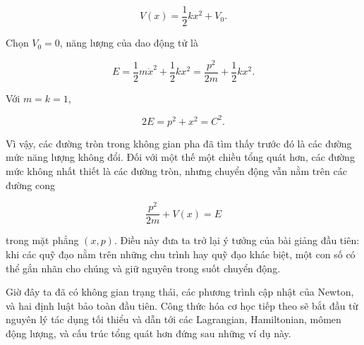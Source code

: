 \begin{equation}
  V(x)=\frac12kx^2+V_0.
  \label{eq:spring-potential}
\end{equation}

Chọn \(V_0=0\), năng lượng của dao động tử là

\begin{equation}
  E=\frac12m\dot x^2+\frac12kx^2
   =\frac{p^2}{2m}+\frac12kx^2.
  \label{eq:oscillator-energy}
\end{equation}

Với \(m=k=1\),

\begin{equation}
  2E=p^2+x^2=C^2.
  \label{eq:oscillator-energy-circle}
\end{equation}

Vì vậy, các đường tròn trong không gian pha đã tìm thấy trước đó là các đường mức năng lượng không đổi. Đối với một thế một chiều tổng quát hơn, các đường mức không nhất thiết là các đường tròn, nhưng chuyển động vẫn nằm trên các đường cong

\begin{equation}
  \frac{p^2}{2m}+V(x)=E
  \label{eq:general-energy-contour}
\end{equation}

trong mặt phẳng \((x,p)\). Điều này đưa ta trở lại ý tưởng của bài giảng đầu tiên: khi các quỹ đạo nằm trên những chu trình hay quỹ đạo khác biệt, một con số có thể gắn nhãn cho chúng và giữ nguyên trong suốt chuyển động.

Giờ đây ta đã có không gian trạng thái, các phương trình cập nhật của Newton, và hai định luật bảo toàn đầu tiên. Công thức hóa cơ học tiếp theo sẽ bắt đầu từ nguyên lý tác dụng tối thiểu và dẫn tới các Lagrangian, Hamiltonian, mômen động lượng, và cấu trúc tổng quát hơn đứng sau những ví dụ này.

\begin{classroomqa}
\end{classroomqa}